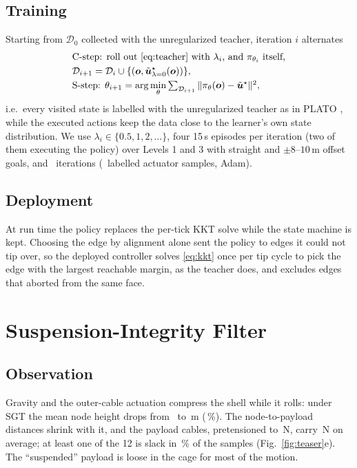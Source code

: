 \documentclass[letterpaper,10pt,conference]{IEEEtran}
\newcommand{\vect}[1]{\boldsymbol{#1}}
\begin{document}
\subsection{Training}
Starting from $\mathcal D_0$ collected with the unregularized teacher,
iteration $i$ alternates
\begin{subequations}\label{eq:gps}
\begin{align}
&\text{C-step: roll out \eqref{eq:teacher} with }\lambda_i\text{, and }\pi_{\theta_i}\text{ itself,}\\
&\mathcal D_{i+1}=\mathcal D_i\cup\{(\vect o,\tilde{\vect u}^\star_{\lambda=0}(\vect o))\},\\
&\text{S-step: }\theta_{i+1}=\arg\min_\theta\textstyle\sum_{\mathcal D_{i+1}}\|\pi_\theta(\vect o)-\tilde{\vect u}^\star\|^2,
\end{align}
\end{subequations}
i.e.\ every visited state is labelled with the unregularized teacher as
in PLATO \cite{kahn2017plato}, while the executed actions keep the data
close to the learner's own state distribution. We use
$\lambda_i\in\{0.5,1,2,\dots\}$, four 15\,s episodes per iteration (two
of them executing the policy) over Levels 1 and 3 with straight and
$\pm8$--$10$\,m offset goals, and \gpsIterations\ iterations
(\gpsSamples\ labelled actuator samples, Adam).

\subsection{Deployment}
At run time the policy replaces the per-tick KKT solve while the state
machine is kept. Choosing the edge by alignment alone sent the policy to
edges it could not tip over, so the deployed controller solves
\eqref{eq:kkt} once per tip cycle to pick the edge with the largest
reachable margin, as the teacher does, and excludes edges that aborted
from the same face.

\section{Suspension-Integrity Filter}\label{sec:shield}

\subsection{Observation}
Gravity and the outer-cable actuation compress the shell while it rolls:
under SGT the mean node height drops from \sagInitialHeight\ to
\sagMeanHeight\,m (\sagPercent\,\%). The node-to-payload distances
shrink with it, and the payload cables, pretensioned to
\sagDesignTension\,N, carry \sagMeanTension\,N on average; at least one
of the 12 is slack in \shAnySlackOff\,\% of the samples
(Fig.~\ref{fig:teaser}e). The ``suspended'' payload is loose in the cage
for most of the motion.
\end{document}

